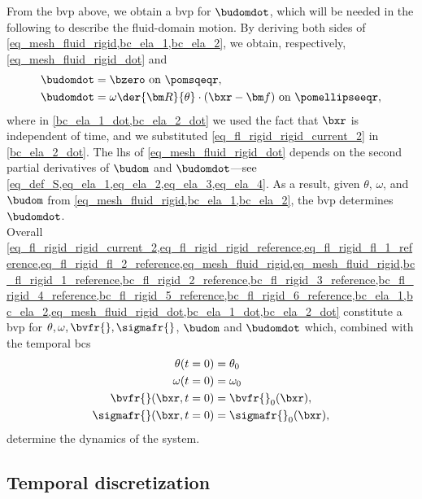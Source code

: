 From  the \ac{bvp} above, we obtain a \ac{bvp} for $\budomdot$, which will be needed in the following to describe the fluid-domain motion. By deriving both sides of \cref{eq_mesh_fluid_rigid,bc_ela_1,bc_ela_2}, we obtain, respectively, \cref{eq_mesh_fluid_rigid_dot} and
\begin{align}
        \label{bc_ela_1_dot}
        \budomdot & =\bzero \text{ on } \pomsqeqr,                                                         \\
        \label{bc_ela_2_dot}
        \budomdot & =  \omega \der{{\bm R}}{\theta}\cdot (\bxr - \bfocalpoint) \text{ on } \pomellipseeqr,
\end{align}
where in \cref{bc_ela_1_dot,bc_ela_2_dot} we used the fact that $\bxr$ is independent of time, and we substituted  \cref{eq_fl_rigid_rigid_current_2} in \cref{bc_ela_2_dot}. The \ac{lhs} of \cref{eq_mesh_fluid_rigid_dot} depends on the second partial derivatives of $\budom$ and $\budomdot$---see \cref{eq_def_S,eq_ela_1,eq_ela_2,eq_ela_3,eq_ela_4}. As a result, given $\theta$, $\omega$, and $\budom$ from \cref{eq_mesh_fluid_rigid,bc_ela_1,bc_ela_2}, the \ac{bvp}   determines $\budomdot$.\vspace{0.5cm}\\

Overall \cref{eq_fl_rigid_rigid_current_2,eq_fl_rigid_rigid_reference,eq_fl_rigid_fl_1_reference,eq_fl_rigid_fl_2_reference,eq_mesh_fluid_rigid,eq_mesh_fluid_rigid,bc_fl_rigid_1_reference,bc_fl_rigid_2_reference,bc_fl_rigid_3_reference,bc_fl_rigid_4_reference,bc_fl_rigid_5_reference,bc_fl_rigid_6_reference,bc_ela_1,bc_ela_2,eq_mesh_fluid_rigid_dot,bc_ela_1_dot,bc_ela_2_dot}
constitute a \ac{bvp} for $\theta, \omega, \bvfr{}, \sigmafr{}$, $\budom$ and $\budomdot$ which, combined with the temporal \acp{bc}
\begin{align}
        \theta(t=0)             & = \theta_0              \\
        \omega(t=0)             & = \omega_0              \\
        {\bvfr{}}(\bxr, t=0)    & = {\bvfr{}}_0(\bxr),    \\
        {\sigmafr{}}(\bxr, t=0) & = {\sigmafr{}}_0(\bxr),
\end{align}
determine the dynamics of the system.


\subsection{Temporal discretization}\label{sec_temp_discretization_rig}



